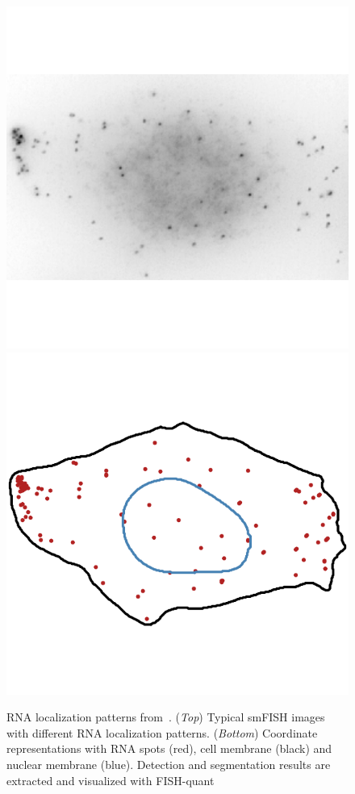 \begin{figure}[]
		\includegraphics[width=0.95\linewidth]{figures/introduction/real_image_protrusion}
		\vfill
		\includegraphics[width=0.95\linewidth]{figures/introduction/real_coord_protrusion}
	\endminipage
	\caption[RNA localization patterns: from pixels to numbers]{RNA localization patterns from~\cite{pointfish_2022}.
	(\textit{Top}) Typical smFISH images with different RNA localization patterns.
	(\textit{Bottom}) Coordinate representations with RNA spots (red), cell membrane (black) and nuclear membrane (blue).
	Detection and segmentation results are extracted and visualized with FISH-quant~\cite{Imbert_fq_2022}}
	\label{fig:intro_localization_patterns}
\end{figure}

